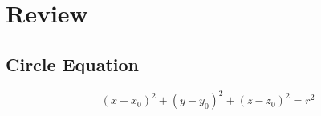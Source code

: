\section{Review}

  \subsection{Circle Equation}

    \begin{equation}
      \left( x - x_{0} \right)^{2}
        + \left( y - y_{0} \right)^{2}
        + \left( z - z_{0} \right)^{2}
        = r^{2}
    \end{equation}